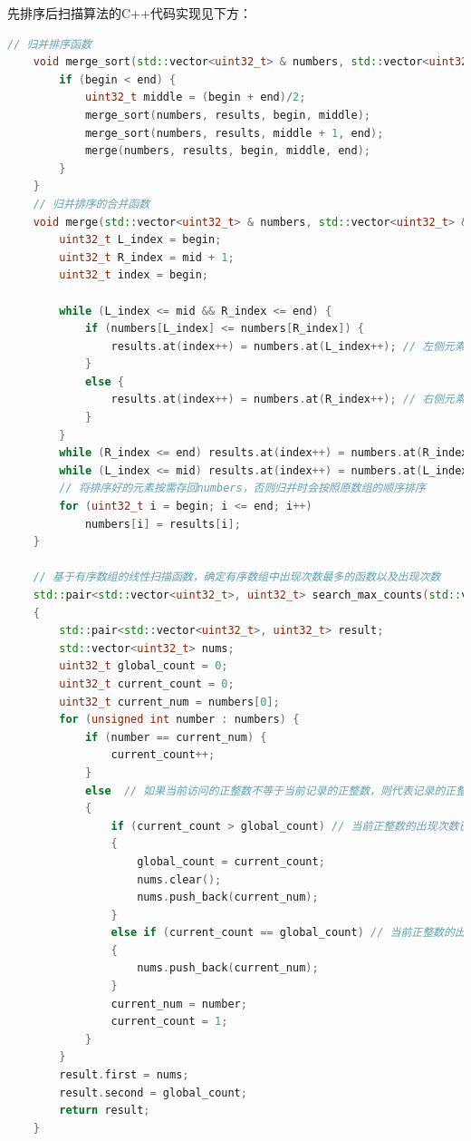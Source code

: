 \documentclass[UTF8,12pt,a4paper]{ctexart}
\begin{document}
先排序后扫描算法的C++代码实现见下方：
\begin{lstlisting}[language={C++}, basicstyle=\ttfamily\footnotesize]
    // 归并排序函数
    void merge_sort(std::vector<uint32_t> & numbers, std::vector<uint32_t> & results, uint32_t begin, uint32_t end) {
        if (begin < end) {
            uint32_t middle = (begin + end)/2;
            merge_sort(numbers, results, begin, middle);
            merge_sort(numbers, results, middle + 1, end);
            merge(numbers, results, begin, middle, end);
        }
    }
    // 归并排序的合并函数
    void merge(std::vector<uint32_t> & numbers, std::vector<uint32_t> & results, uint32_t begin, uint32_t mid, uint32_t end) {
        uint32_t L_index = begin;
        uint32_t R_index = mid + 1;
        uint32_t index = begin;
    
        while (L_index <= mid && R_index <= end) {
            if (numbers[L_index] <= numbers[R_index]) {
                results.at(index++) = numbers.at(L_index++); // 左侧元素更小，移入左侧元素
            }
            else {
                results.at(index++) = numbers.at(R_index++); // 右侧元素更小，移入右侧元素
            }
        }
        while (R_index <= end) results.at(index++) = numbers.at(R_index++);
        while (L_index <= mid) results.at(index++) = numbers.at(L_index++);
        // 将排序好的元素按需存回numbers，否则归并时会按照原数组的顺序排序
        for (uint32_t i = begin; i <= end; i++)
            numbers[i] = results[i];
    }
    
    // 基于有序数组的线性扫描函数，确定有序数组中出现次数最多的函数以及出现次数
    std::pair<std::vector<uint32_t>, uint32_t> search_max_counts(std::vector<uint32_t>& numbers)
    {
        std::pair<std::vector<uint32_t>, uint32_t> result;
        std::vector<uint32_t> nums;
        uint32_t global_count = 0;
        uint32_t current_count = 0;
        uint32_t current_num = numbers[0];
        for (unsigned int number : numbers) {
            if (number == current_num) {
                current_count++;
            }
            else  // 如果当前访问的正整数不等于当前记录的正整数，则代表记录的正整数段访问结束，可以更新全局信息
            {
                if (current_count > global_count) // 当前正整数的出现次数已经超过了最大出现次数，更新
                {
                    global_count = current_count;
                    nums.clear();
                    nums.push_back(current_num);
                }
                else if (current_count == global_count) // 当前正整数的出现次数等于最大出现次数，保留
                {
                    nums.push_back(current_num);
                }
                current_num = number;
                current_count = 1;
            }
        }
        result.first = nums;
        result.second = global_count;
        return result;
    }
\end{lstlisting}
    
\end{document}

